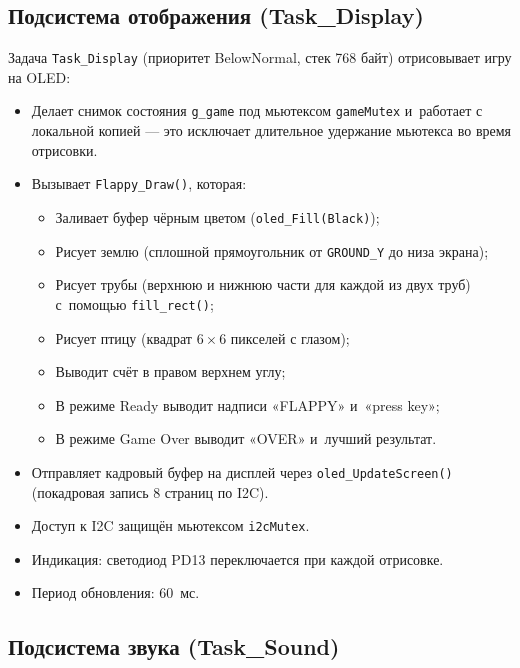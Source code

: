 \documentclass[a4paper,12pt]{article}
\begin{document}
\subsection{Подсистема отображения (Task\_Display)}


Задача \texttt{Task\_Display} (приоритет BelowNormal, стек 768 байт) отрисовывает игру на OLED:
\begin{itemize}
    \item Делает снимок состояния \texttt{g\_game} под мьютексом \texttt{gameMutex} и~работает с локальной копией — это исключает длительное удержание мьютекса во время отрисовки.
    \item Вызывает \texttt{Flappy\_Draw()}, которая:
        \begin{itemize}
            \item Заливает буфер чёрным цветом (\texttt{oled\_Fill(Black)});
            \item Рисует землю (сплошной прямоугольник от \texttt{GROUND\_Y} до низа экрана);
            \item Рисует трубы (верхнюю и нижнюю части для каждой из двух труб) с~помощью \texttt{fill\_rect()};
            \item Рисует птицу (квадрат $6\times6$ пикселей с глазом);
            \item Выводит счёт в правом верхнем углу;
            \item В режиме Ready выводит надписи «FLAPPY» и~«press key»;
            \item В режиме Game Over выводит «OVER» и~лучший результат.
        \end{itemize}
    \item Отправляет кадровый буфер на дисплей через \texttt{oled\_UpdateScreen()} (покадровая запись 8 страниц по I2C).
    \item Доступ к I2C защищён мьютексом \texttt{i2cMutex}.
    \item Индикация: светодиод PD13 переключается при каждой отрисовке.
    \item Период обновления: 60~мс.
\end{itemize}


\subsection{Подсистема звука (Task\_Sound)}
\end{document}
